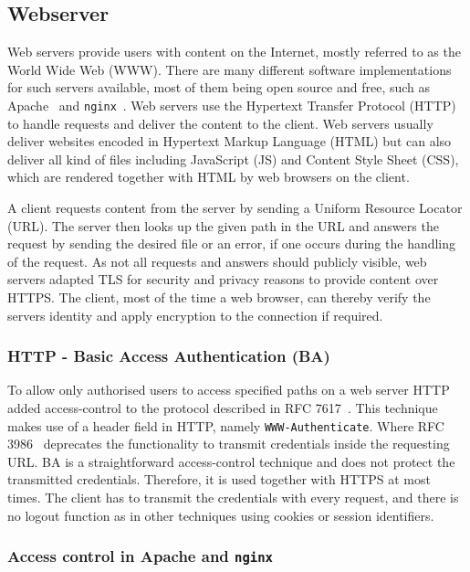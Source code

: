 \subsection{Webserver}

Web servers provide users with content on the Internet, mostly referred to as
the World Wide Web (WWW). There are many different software implementations for
such servers available, most of them being open source and free, such as
Apache~\cite{apacheweb} and \texttt{nginx}~\cite{nginxweb}. Web servers use the
Hypertext Transfer Protocol (HTTP) to handle requests and deliver the content to
the client. Web servers usually deliver websites encoded in Hypertext Markup
Language (HTML) but can also deliver all kind of files including JavaScript (JS)
and Content Style Sheet (CSS), which are rendered together with HTML by web
browsers on the client.

A client requests content from the server by sending a Uniform Resource Locator
(URL). The server then looks up the given path in the URL and answers the
request by sending the desired file or an error, if one occurs during the
handling of the request. As not all requests and answers should publicly
visible, web servers adapted TLS for security and privacy reasons to provide
content over HTTPS. The client, most of the time a web browser, can thereby
verify the server\textquotesingle s identity and apply encryption to the
connection if required.

\subsubsection{HTTP - Basic Access Authentication (BA)}

To allow only authorised users to access specified paths on a web server HTTP
added access-control to the protocol described in RFC 7617~\cite{rfc7617}. This
technique makes use of a header field in HTTP, namely \texttt{WWW-Authenticate}.
Where RFC 3986~\cite{rfc3986} deprecates the functionality to transmit
credentials inside the requesting URL. BA is a straightforward access-control
technique and does not protect the transmitted credentials. Therefore, it is
used together with HTTPS at most times. The client has to transmit the
credentials with every request, and there is no logout function as in other
techniques using cookies or session identifiers.

\subsubsection{Access control in Apache and \texttt{nginx}}

